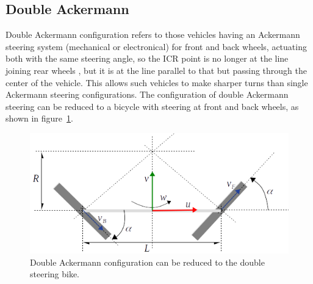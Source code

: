 \subsection{Double Ackermann}
Double Ackermann configuration refers to those vehicles having an Ackermann steering system (mechanical or electronical) for front and back wheels, actuating both with the same steering angle, so the ICR point is no longer at the line joining rear wheels , but it is at the line parallel to that but passing through the center of the vehicle. This allows such vehicles to make sharper turns than single Ackermann steering configurations. The configuration of double Ackermann steering can be reduced to a bicycle with  steering at front and back wheels, as shown in figure~\ref{fig:double_ackermann_kinematics}.
\begin{figure}[bth!]
  \begin{center}
    \includegraphics[width=1.0\columnwidth]{figures/double_ackermann_kinematics.png}
    \caption{Double Ackermann configuration can be reduced to the double steering bike.}
    \label{fig:double_ackermann_kinematics}
  \end{center}
\end{figure}

